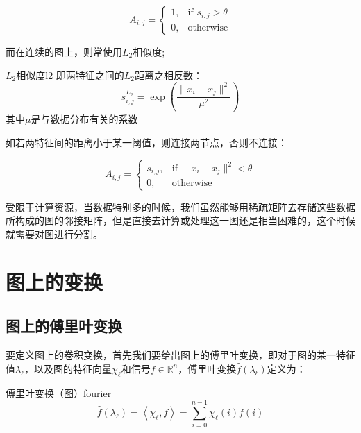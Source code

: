 \documentclass[color=gray,base=hide,cn]{elegantbook}
\begin{document}
\begin{equation}
    A_{i,j} = \left\{\begin{matrix}
        1, & \text{if } s_{i,j} > \theta \\
        0, & \text{otherwise}
    \end{matrix}\right.
\end{equation}

而在连续的图上，则常使用$L_2$相似度;

\begin{definition}{$L_2$相似度}{l2}
    即两特征之间的$L_2$距离之相反数：
    \begin{equation}
        s^{L_2}_{i,j} = \exp \left ( \frac{\|x_i - x_j \|^2}{\mu^2}  \right )
    \end{equation}
    其中$\mu$是与数据分布有关的系数
\end{definition}

如若两特征间的距离小于某一阈值，则连接两节点，否则不连接：

\begin{equation}
    A_{i,j} = \left\{\begin{matrix}
        s_{i,j}, & \text{if } \|x_i - x_j \|^2 < \theta \\
        0,       & \text{otherwise}
    \end{matrix}\right.
\end{equation}

受限于计算资源，当数据特别多的时候，我们虽然能够用稀疏矩阵去存储这些数据所构成的图的邻接矩阵，但是直接去计算或处理这一图还是相当困难的，这个时候就需要对图进行分割。

\chapter{图上的变换}

\section{图上的傅里叶变换}

要定义图上的卷积变换，首先我们要给出图上的傅里叶变换，即对于图的某一特征值$\lambda_{\ell}$，以及图的特征向量$\chi _\ell$和信号$f \in \mathbb{R}^n$，傅里叶变换$\hat{f}(\lambda_{\ell})$定义为：

\begin{definition}{傅里叶变换（图）}{fourier}
    \begin{equation}
        \hat{f}(\lambda_{\ell}) = \left \langle \chi_\ell,f \right \rangle = \sum_{i=0}^{n-1}\chi_\ell(i)f(i)
    \end{equation}
\end{definition}
\end{document}

